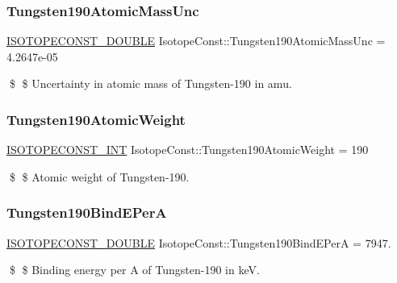 \subsubsection{\texorpdfstring{Tungsten190\+Atomic\+Mass\+Unc}{Tungsten190AtomicMassUnc}}
{\footnotesize\ttfamily \mbox{\hyperlink{group___isotope_const-_macros_ga8f45a7272ce02c0b4c65c44636ed719a}{I\+S\+O\+T\+O\+P\+E\+C\+O\+N\+S\+T\+\_\+\+D\+O\+U\+B\+LE}} Isotope\+Const\+::\+Tungsten190\+Atomic\+Mass\+Unc = 4.\+2647e-\/05}

\$ \$ Uncertainty in atomic mass of Tungsten-\/190 in amu. \mbox{\label{group___isotope_const-_tungsten-_w190_gac8c26c43bd65bc6825999abf15099486}} 
\subsubsection{\texorpdfstring{Tungsten190\+Atomic\+Weight}{Tungsten190AtomicWeight}}
{\footnotesize\ttfamily \mbox{\hyperlink{group___isotope_const-_macros_ga5f18360b3e99483a35c32d789e62621c}{I\+S\+O\+T\+O\+P\+E\+C\+O\+N\+S\+T\+\_\+\+I\+NT}} Isotope\+Const\+::\+Tungsten190\+Atomic\+Weight = 190}

\$ \$ Atomic weight of Tungsten-\/190. \mbox{\label{group___isotope_const-_tungsten-_w190_gaa6600de572c1830711eaaae03b76f512}} 
\subsubsection{\texorpdfstring{Tungsten190\+Bind\+E\+PerA}{Tungsten190BindEPerA}}
{\footnotesize\ttfamily \mbox{\hyperlink{group___isotope_const-_macros_ga8f45a7272ce02c0b4c65c44636ed719a}{I\+S\+O\+T\+O\+P\+E\+C\+O\+N\+S\+T\+\_\+\+D\+O\+U\+B\+LE}} Isotope\+Const\+::\+Tungsten190\+Bind\+E\+PerA = 7947.}

\$ \$ Binding energy per A of Tungsten-\/190 in keV. \mbox{\label{group___isotope_const-_tungsten-_w190_gad84bda196da5c36a4b6f0bce05bd4bd3}} 
